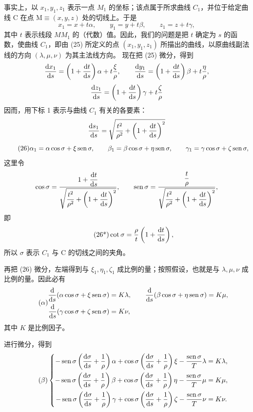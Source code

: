 事实上，以 \(x_1,y_1,z_1\) 表示一点 \(M_1\) 的坐标；该点属于所求曲线 \(C_1\)，并位于给定曲线 C 在点 \(\mathrm{M}\equiv(x,y,z)\) 处的切线上。于是
\begin{equation}\tag{25}
x_1=x+t\alpha,
\qquad
 y_1=y+t\beta,
\qquad
 z_1=z+t\gamma,
\end{equation}
其中 \(t\) 表示线段 \(MM_1\) 的（代数）值。因此，我们的问题是把 \(t\) 确定为 \(s\) 的函数，使曲线 \(C_1\)，即由 (25) 所定义的点 \((x_1,y_1,z_1)\) 所描出的曲线，以原曲线副法线的方向 \((\lambda,\mu,\nu)\) 为其主法线方向。
现在把 (25) 微分，得到
\[
\frac{\mathrm{d} x_1}{\mathrm{d} s}=\left(1+\frac{\mathrm{d} t}{\mathrm{d} s}\right)\alpha+t\frac{\xi}{\rho},
\qquad
\frac{\mathrm{d} y_1}{\mathrm{d} s}=\left(1+\frac{\mathrm{d} t}{\mathrm{d} s}\right)\beta+t\frac{\eta}{\rho},
\]
\[
\frac{\mathrm{d} z_1}{\mathrm{d} s}=\left(1+\frac{\mathrm{d} t}{\mathrm{d} s}\right)\gamma+t\frac{\zeta}{\rho}
\]
因而，用下标 1 表示与曲线 \(C_1\) 有关的各要素：
\[
\frac{\mathrm{d} s_1}{\mathrm{d} s}=\sqrt{\frac{t^2}{\rho^2}+\left(1+\frac{\mathrm{d} t}{\mathrm{d} s}\right)^2}
\]
\begin{equation}\tag{26}
\alpha_1=\alpha\cos\sigma+\xi\operatorname{sen}\sigma,
\qquad
\beta_1=\beta\cos\sigma+\eta\operatorname{sen}\sigma,
\qquad
\gamma_1=\gamma\cos\sigma+\zeta\operatorname{sen}\sigma,
\end{equation}
这里令
\[
\cos\sigma=\frac{1+\dfrac{\mathrm{d} t}{\mathrm{d} s}}{\sqrt{\dfrac{t^2}{\rho^2}+\left(1+\dfrac{\mathrm{d} t}{\mathrm{d} s}\right)^2}},
\qquad
\operatorname{sen}\sigma=\frac{\dfrac{t}{\rho}}{\sqrt{\dfrac{t^2}{\rho^2}+\left(1+\dfrac{\mathrm{d} t}{\mathrm{d} s}\right)^2}},
\]
即
\begin{equation}\tag{26*}
\cot\sigma=\frac{\rho}{t}\left(1+\frac{\mathrm{d} t}{\mathrm{d} s}\right),
\end{equation}
所以 \(\sigma\) 表示 \(C_1\) 与 C 的切线之间的夹角。

再把 (26) 微分，左端得到与 \(\xi_1,\eta_1,\zeta_1\) 成比例的量；按照假设，也就是与 \(\lambda,\mu,\nu\) 成比例的量。因此必有
\begin{equation}\tag{\ensuremath{\alpha}}
\begin{aligned}
\frac{\diff}{\diff s}(\alpha\cos\sigma+\xi\sen\sigma)&=K\lambda,\qquad
\frac{\diff}{\diff s}(\beta\cos\sigma+\eta\sen\sigma)=K\mu,\\
\frac{\diff}{\diff s}(\gamma\cos\sigma+\zeta\sen\sigma)&=K\nu,
\end{aligned}
\end{equation}
其中 \(K\) 是比例因子。

进行微分，得到
\begin{equation}\tag{\ensuremath{\beta}}
\left\{
\begin{aligned}
-\sen\sigma\left(\frac{\diff\sigma}{\diff s}+\frac{1}{\rho}\right)\alpha
+\cos\sigma\left(\frac{\diff\sigma}{\diff s}+\frac{1}{\rho}\right)\xi
-\frac{\sen\sigma}{T}\lambda&=K\lambda,\\
-\sen\sigma\left(\frac{\diff\sigma}{\diff s}+\frac{1}{\rho}\right)\beta
+\cos\sigma\left(\frac{\diff\sigma}{\diff s}+\frac{1}{\rho}\right)\eta
-\frac{\sen\sigma}{T}\mu&=K\mu,\\
-\sen\sigma\left(\frac{\diff\sigma}{\diff s}+\frac{1}{\rho}\right)\gamma
+\cos\sigma\left(\frac{\diff\sigma}{\diff s}+\frac{1}{\rho}\right)\zeta
-\frac{\sen\sigma}{T}\nu&=K\nu.
\end{aligned}\right.
\end{equation}

